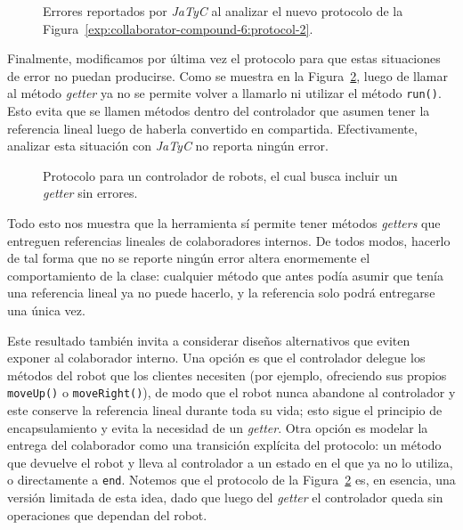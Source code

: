 \begin{figure}[htbp]
\centering

\caption{Errores reportados por \textit{JaTyC} al analizar el nuevo protocolo de la Figura~\ref{exp:collaborator-compound-6:protocol-2}.}
\label{exp:collaborator-compound-6:error-2}
\end{figure}

Finalmente, modificamos por última vez el protocolo para que estas situaciones de error no puedan producirse. Como se muestra en la Figura~\ref{exp:collaborator-compound-6:protocol-3}, luego de llamar al método \textit{getter} ya no se permite volver a llamarlo ni utilizar el método \texttt{run()}. Esto evita que se llamen métodos dentro del controlador que asumen tener la referencia lineal luego de haberla convertido en compartida. Efectivamente, analizar esta situación con \textit{JaTyC} no reporta ningún error.

\begin{figure}[htbp]
\centering

\caption{Protocolo para un controlador de robots, el cual busca incluir un \textit{getter} sin errores.}
\label{exp:collaborator-compound-6:protocol-3}
\end{figure}

Todo esto nos muestra que la herramienta sí permite tener métodos \textit{getters} que entreguen referencias lineales de colaboradores internos. De todos modos, hacerlo de tal forma que no se reporte ningún error altera enormemente el comportamiento de la clase: cualquier método que antes podía asumir que tenía una referencia lineal ya no puede hacerlo, y la referencia solo podrá entregarse una única vez.

Este resultado también invita a considerar diseños alternativos que eviten exponer al colaborador interno. Una opción es que el controlador delegue los métodos del robot que los clientes necesiten (por ejemplo, ofreciendo sus propios \texttt{moveUp()} o \texttt{moveRight()}), de modo que el robot nunca abandone al controlador y este conserve la referencia lineal durante toda su vida; esto sigue el principio de encapsulamiento y evita la necesidad de un \textit{getter}. Otra opción es modelar la entrega del colaborador como una transición explícita del protocolo: un método que devuelve el robot y lleva al controlador a un estado en el que ya no lo utiliza, o directamente a \texttt{end}. Notemos que el protocolo de la Figura~\ref{exp:collaborator-compound-6:protocol-3} es, en esencia, una versión limitada de esta idea, dado que luego del \textit{getter} el controlador queda sin operaciones que dependan del robot.

